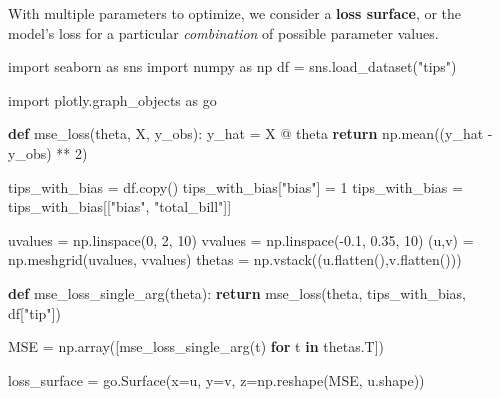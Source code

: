 \documentclass[
  letterpaper,
  DIV=11,
  numbers=noendperiod]{scrreprt}
\newenvironment{Shaded}{\begin{snugshade}}{\end{snugshade}}
\newcommand{\ControlFlowTok}[1]{\textcolor[rgb]{0.00,0.23,0.31}{\textbf{#1}}}
\newcommand{\DecValTok}[1]{\textcolor[rgb]{0.68,0.00,0.00}{#1}}
\newcommand{\FloatTok}[1]{\textcolor[rgb]{0.68,0.00,0.00}{#1}}
\newcommand{\ImportTok}[1]{\textcolor[rgb]{0.00,0.46,0.62}{#1}}
\newcommand{\KeywordTok}[1]{\textcolor[rgb]{0.00,0.23,0.31}{\textbf{#1}}}
\newcommand{\NormalTok}[1]{\textcolor[rgb]{0.00,0.23,0.31}{#1}}
\newcommand{\OperatorTok}[1]{\textcolor[rgb]{0.37,0.37,0.37}{#1}}
\newcommand{\StringTok}[1]{\textcolor[rgb]{0.13,0.47,0.30}{#1}}
\begin{document}
With multiple parameters to optimize, we consider a \textbf{loss
surface}, or the model's loss for a particular \emph{combination} of
possible parameter values.

\begin{Shaded}
\begin{Highlighting}[]
\ImportTok{import}\NormalTok{ seaborn }\ImportTok{as}\NormalTok{ sns}
\ImportTok{import}\NormalTok{ numpy }\ImportTok{as}\NormalTok{ np}
\NormalTok{df }\OperatorTok{=}\NormalTok{ sns.load\_dataset(}\StringTok{"tips"}\NormalTok{)}
\end{Highlighting}
\end{Shaded}

\begin{Shaded}
\begin{Highlighting}[]
\ImportTok{import}\NormalTok{ plotly.graph\_objects }\ImportTok{as}\NormalTok{ go}


\KeywordTok{def}\NormalTok{ mse\_loss(theta, X, y\_obs):}
\NormalTok{    y\_hat }\OperatorTok{=}\NormalTok{ X }\OperatorTok{@}\NormalTok{ theta}
    \ControlFlowTok{return}\NormalTok{ np.mean((y\_hat }\OperatorTok{{-}}\NormalTok{ y\_obs) }\OperatorTok{**} \DecValTok{2}\NormalTok{)    }

\NormalTok{tips\_with\_bias }\OperatorTok{=}\NormalTok{ df.copy()}
\NormalTok{tips\_with\_bias[}\StringTok{"bias"}\NormalTok{] }\OperatorTok{=} \DecValTok{1}
\NormalTok{tips\_with\_bias }\OperatorTok{=}\NormalTok{ tips\_with\_bias[[}\StringTok{"bias"}\NormalTok{, }\StringTok{"total\_bill"}\NormalTok{]]}

\NormalTok{uvalues }\OperatorTok{=}\NormalTok{ np.linspace(}\DecValTok{0}\NormalTok{, }\DecValTok{2}\NormalTok{, }\DecValTok{10}\NormalTok{)}
\NormalTok{vvalues }\OperatorTok{=}\NormalTok{ np.linspace(}\OperatorTok{{-}}\FloatTok{0.1}\NormalTok{, }\FloatTok{0.35}\NormalTok{, }\DecValTok{10}\NormalTok{)}
\NormalTok{(u,v) }\OperatorTok{=}\NormalTok{ np.meshgrid(uvalues, vvalues)}
\NormalTok{thetas }\OperatorTok{=}\NormalTok{ np.vstack((u.flatten(),v.flatten()))}

\KeywordTok{def}\NormalTok{ mse\_loss\_single\_arg(theta):}
    \ControlFlowTok{return}\NormalTok{ mse\_loss(theta, tips\_with\_bias, df[}\StringTok{"tip"}\NormalTok{])}

\NormalTok{MSE }\OperatorTok{=}\NormalTok{ np.array([mse\_loss\_single\_arg(t) }\ControlFlowTok{for}\NormalTok{ t }\KeywordTok{in}\NormalTok{ thetas.T])}

\NormalTok{loss\_surface }\OperatorTok{=}\NormalTok{ go.Surface(x}\OperatorTok{=}\NormalTok{u, y}\OperatorTok{=}\NormalTok{v, z}\OperatorTok{=}\NormalTok{np.reshape(MSE, u.shape))}


\end{Highlighting}
\end{Shaded}
\end{document}
